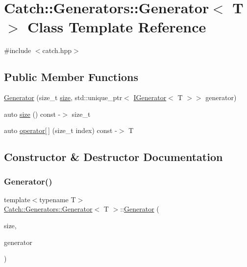 \hypertarget{class_catch_1_1_generators_1_1_generator}{}\section{Catch\+:\+:Generators\+:\+:Generator$<$ T $>$ Class Template Reference}
\label{class_catch_1_1_generators_1_1_generator}


{\ttfamily \#include $<$catch.\+hpp$>$}

\subsection*{Public Member Functions}
\begin{DoxyCompactItemize}
\item 
\mbox{\hyperlink{class_catch_1_1_generators_1_1_generator_a3d992b33c5c1abb7370065c6ae10388f}{Generator}} (size\+\_\+t \mbox{\hyperlink{class_catch_1_1_generators_1_1_generator_a4ebea9a7448f8f374bc7cff5d7b63041}{size}}, std\+::unique\+\_\+ptr$<$ \mbox{\hyperlink{struct_catch_1_1_generators_1_1_i_generator}{I\+Generator}}$<$ T $>$$>$ generator)
\item 
auto \mbox{\hyperlink{class_catch_1_1_generators_1_1_generator_a4ebea9a7448f8f374bc7cff5d7b63041}{size}} () const -\/$>$ size\+\_\+t
\item 
auto \mbox{\hyperlink{class_catch_1_1_generators_1_1_generator_ad8835935e962baaf1fab6c6dcac83865}{operator\mbox{[}$\,$\mbox{]}}} (size\+\_\+t index) const -\/$>$ T
\end{DoxyCompactItemize}


\subsection{Constructor \& Destructor Documentation}
\mbox{\label{class_catch_1_1_generators_1_1_generator_a3d992b33c5c1abb7370065c6ae10388f}} 
\subsubsection{\texorpdfstring{Generator()}{Generator()}}
{\footnotesize\ttfamily template$<$typename T$>$ \\
\mbox{\hyperlink{class_catch_1_1_generators_1_1_generator}{Catch\+::\+Generators\+::\+Generator}}$<$ T $>$\+::\mbox{\hyperlink{class_catch_1_1_generators_1_1_generator}{Generator}} (\begin{DoxyParamCaption}\item[{size\+\_\+t}]{size,  }\item[{std\+::unique\+\_\+ptr$<$ \mbox{\hyperlink{struct_catch_1_1_generators_1_1_i_generator}{I\+Generator}}$<$ T $>$$>$}]{generator }\end{DoxyParamCaption})\hspace{0.3cm}{\ttfamily [inline]}}



